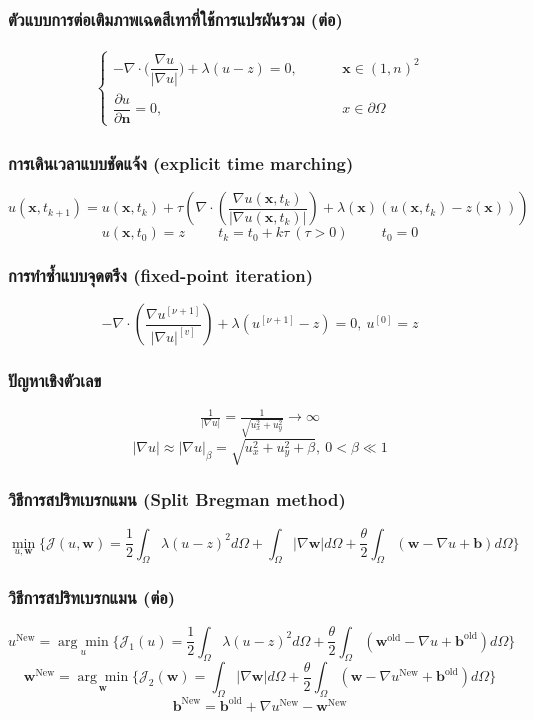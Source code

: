 \documentclass[xcolor=dvipsnames, xetex,serif]{beamer}
\numberwithin{equation}{section}
\begin{document}
		\begin{frame}
			\frametitle{ตัวแบบการต่อเติมภาพเฉดสีเทาที่ใช้การแปรผันรวม (ต่อ)}
			\begin{align*}
			\left \{ \begin{array}{ll}  - \nabla \cdot  \Big( \dfrac{\nabla u}{|\nabla u|} \Big) + \lambda (u-z) = 0,  & \hspace{1cm} \mathbf{x} \in (1,n)^2 \\ \dfrac{\partial u}{\partial \boldsymbol{n}} = 0, & \hspace{1cm} x \in \partial \Omega \end{array} \right .
			\end{align*}			
		\end{frame} 
		\begin{frame}
			\frametitle{การเดินเวลาแบบชัดแจ้ง (explicit time marching)}
			$$
			u(\mathbf{x},t_{k+1})=u(\mathbf{x},t_{k})+\tau\left(\nabla \cdot\left(\dfrac{\nabla u (\mathbf{x},t_k)}{| \nabla u (\mathbf{x},t_k) | }\right) + \lambda(\mathbf{x})(u (\mathbf{x},t_k)-z(\mathbf{x})) \right)
			$$
			\vspace{1cm}
			$$
			u(\mathbf{x},t_0)=z \hspace{1cm} t_k=t_0+k\tau\ (\tau>0)  \hspace{1cm}  t_0=0
			$$			
		\end{frame} 
		\begin{frame}
			\frametitle{การทำซ้ำแบบจุดตรึง (fixed-point iteration)}
			$$
				- \nabla\cdot\left(\dfrac{\nabla u^{[\nu+1]}}{{| \nabla u |}^{[v]} }\right) + \lambda(u^{[\nu+1]}-z)  = 0,\ u^{[0]}=z
			$$
		\end{frame} 
		\begin{frame}
			\frametitle{ปัญหาเชิงตัวเลข}
			$$
			\tfrac{1}{| \nabla u |}=\tfrac{1}{\sqrt{u_x^2+u_y^2}} \rightarrow \infty
			$$
			\vspace{1cm}
			$$
			|\nabla u| \approx| \nabla u |_\beta=\sqrt{u_x^2+u_y^2+\beta},\ 0< \beta \ll 1
			$$
		\end{frame} 
		\begin{frame}
			\frametitle{วิธีการสปริทเบรกแมน (Split Bregman method)}
			$$
			\min_{u,\boldsymbol{w}} \{ \mathcal{J}(u,\boldsymbol{w}) = \dfrac{1}{2} \int_{\Omega} \lambda(u-z)^2 d\Omega +  \int_{\Omega}  |\nabla \boldsymbol{w}|  d\Omega + \frac{\theta}{2} \int_{\Omega} (\boldsymbol{w} - \nabla u + \boldsymbol{b}) d\Omega \}
			$$
		\end{frame} 
		\begin{frame}
			\frametitle{วิธีการสปริทเบรกแมน (ต่อ)}
			$$
			u^{\text{New}}=\underset{u}{\arg\min} \{ \mathcal{J}_1(u) = \dfrac{1}{2} \int_{\Omega} \lambda(u-z)^2 d\Omega + \frac{\theta}{2} \int_{\Omega} (\boldsymbol{w}^{\text{old}} - \nabla u + \boldsymbol{b}^{\text{old}}) d\Omega \}
			$$
			$$
			\boldsymbol{w}^{\text{New}}=\underset{\boldsymbol{w}}{\arg\min} \{ \mathcal{J}_2(\boldsymbol{w}) = \int_{\Omega}  |\nabla \boldsymbol{w}|  d\Omega  + \frac{\theta}{2} \int_{\Omega} (\boldsymbol{w} - \nabla u^{\text{New}} + \boldsymbol{b}^{\text{old}}) d\Omega \}
			$$
			$$
			\boldsymbol{b}^{\text{New}}=\boldsymbol{b}^{\text{old}}+\nabla u^{\text{New}}-\boldsymbol{w}^{\text{New}}
			$$
		\end{frame} 
\end{document}
